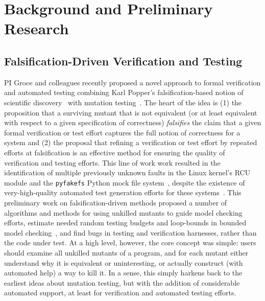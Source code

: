 \section{Background and Preliminary Research}

\subsection{Falsification-Driven Verification and Testing}

PI Groce and colleagues recently proposed a novel approach to
formal verification and automated testing 
combining Karl Popper's falsification-based notion of
scientific discovery~\cite{Popper,popperconjectures} with mutation
testing~\cite{groce2015verified,groce2018verified,mutKernel}.
The heart of the idea is (1) the proposition that a surviving mutant that is not
equivalent (or at least equivalent with respect to a given
specification of correctness) \emph{falsifies} the claim that a given
formal verification or test effort captures the full notion of
correctness for a system and (2) the proposal that refining a
verification or test effort by repeated efforts at falsification is an
effective method for ensuring the quality of verification and testing
efforts.  This line of work
work resulted in the identification of multiple previously unknown faults in
the Linux kernel's
RCU~\cite{MathieuDesnoyers2012URCU,DinakarGuniguntala2008IBMSysJ,McKenney:2013:SDS:2483852.2483867}
module and the {\tt pyfakefs} Python mock file
system~\cite{pyfakefs}, despite the existence of very-high-quality
automated test generation efforts for these
systems~\cite{rcutorture,TSTL}.  This preliminary work on
falsification-driven methods proposed a number of algorithms and
methods for using unkilled mutants to guide model checking efforts,
estimate needed random testing budgets and loop-bounds in bounded model
checking~\cite{CBMCp,BMC}, and find bugs in testing and verification
harnesses, rather than the code under test.  At a high level, however,
the core concept was simple:  users should examine all unkilled
mutants of a program, and for each mutant either understand why it is
equivalent or uninteresting, or actually construct (with automated
help) a way to kill it.  In a sense, this simply harkens back to the
earliest ideas about mutation testing, but with the addition of
considerable automated support, at least for verification and
automated testing efforts.

